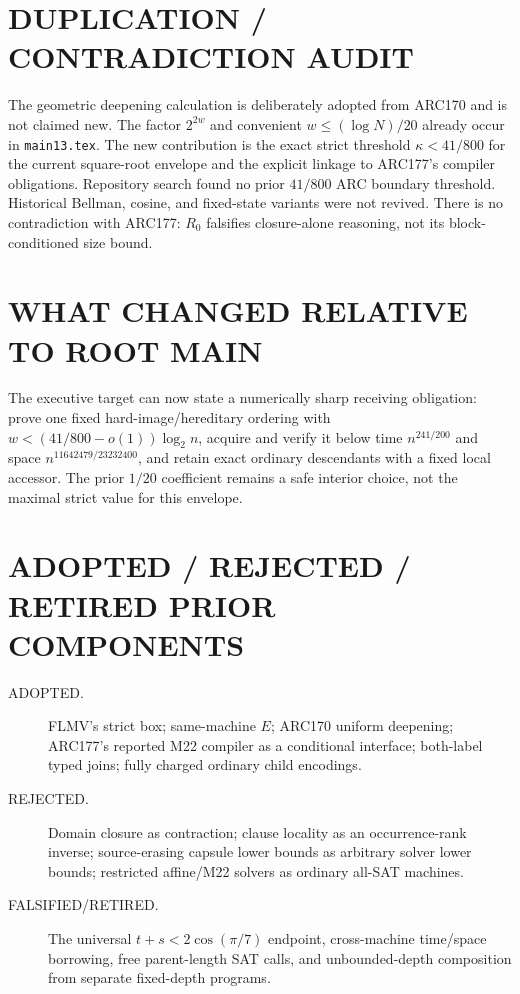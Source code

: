 \documentclass[11pt]{article}
\begin{document}
\section{DUPLICATION / CONTRADICTION AUDIT}
The geometric deepening calculation is deliberately adopted from ARC170 and
is not claimed new.  The factor $2^{2w}$ and convenient $w\le(\log N)/20$
already occur in \texttt{main13.tex}.  The new contribution is the exact
strict threshold $\kappa<41/800$ for the current square-root envelope and the
explicit linkage to ARC177's compiler obligations.  Repository search found
no prior $41/800$ ARC boundary threshold.  Historical Bellman, cosine, and
fixed-state variants were not revived.  There is no contradiction with
ARC177: $R_0$ falsifies closure-alone reasoning, not its block-conditioned
size bound.

\section{WHAT CHANGED RELATIVE TO ROOT MAIN}
The executive target can now state a numerically sharp receiving obligation:
prove one fixed hard-image/hereditary ordering with
$w<(41/800-o(1))\log_2n$, acquire and verify it below time $n^{241/200}$ and
space $n^{11642479/23232400}$, and retain exact ordinary descendants with a
fixed local accessor.  The prior $1/20$ coefficient remains a safe interior
choice, not the maximal strict value for this envelope.

\section{ADOPTED / REJECTED / RETIRED PRIOR COMPONENTS}
\begin{description}
\item[ADOPTED.] FLMV's strict box; same-machine $E$; ARC170 uniform
deepening; ARC177's reported M22 compiler as a conditional interface;
both-label typed joins; fully charged ordinary child encodings.
\item[REJECTED.] Domain closure as contraction; clause locality as an
occurrence-rank inverse; source-erasing capsule lower bounds as arbitrary
solver lower bounds; restricted affine/M22 solvers as ordinary all-SAT
machines.
\item[FALSIFIED/RETIRED.] The universal $t+s<2\cos(\pi/7)$ endpoint,
cross-machine time/space borrowing, free parent-length SAT calls, and
unbounded-depth composition from separate fixed-depth programs.
\end{description}
\end{document}
